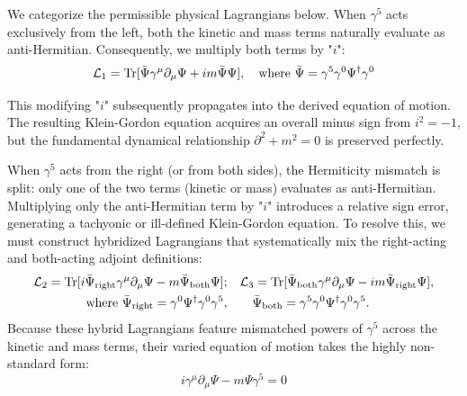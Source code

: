 We categorize the permissible physical Lagrangians below. 
When $\gamma^5$ acts exclusively from the left, both the kinetic and mass terms naturally evaluate as anti-Hermitian. Consequently, we multiply both terms by "$i$": 
\begin{equation}
    \mathcal{L}_1={\rm Tr}[ \bar\Psi\gamma^\mu\partial_\mu\Psi+im\bar\Psi\Psi], \quad \text{where } \bar\Psi=\gamma^5\gamma^0\Psi^\dagger\gamma^0
\end{equation}

This modifying "$i$" subsequently propagates into the derived equation of motion. The resulting Klein-Gordon equation acquires an overall minus sign from $i^2=-1$, but the fundamental dynamical relationship $\partial^2 + m^2 = 0$ is preserved perfectly.

When $\gamma^5$ acts from the right (or from both sides), the Hermiticity mismatch is split: only one of the two terms (kinetic or mass) evaluates as anti-Hermitian. Multiplying only the anti-Hermitian term by "$i$" introduces a relative sign error, generating a tachyonic or ill-defined Klein-Gordon equation. To resolve this, we must construct hybridized Lagrangians that systematically mix the right-acting and both-acting adjoint definitions: 
\begin{equation}
\begin{aligned}
    \mathcal{L}_2={\rm Tr}[ i\bar\Psi_{\text{right}}\gamma^\mu\partial_\mu\Psi-m\bar\Psi_{\text{both}}\Psi]; &\quad
    \mathcal{L}_3={\rm Tr}[ \bar\Psi_{\text{both}}\gamma^\mu\partial_\mu\Psi-im\bar\Psi_{\text{right}}\Psi], \\
    \text{where }\bar\Psi_{\text{right}}=\gamma^0\Psi^\dagger\gamma^0\gamma^5,&\qquad \bar\Psi_{\text{both}}=\gamma^5\gamma^0\Psi^\dagger\gamma^0\gamma^5.
\end{aligned}
\end{equation}
Because these hybrid Lagrangians feature mismatched powers of $\gamma^5$ across the kinetic and mass terms, their varied equation of motion takes the highly non-standard form: 
\begin{equation}
    i\gamma^\mu\partial_\mu\Psi -m\Psi\gamma^5=0
\end{equation}
